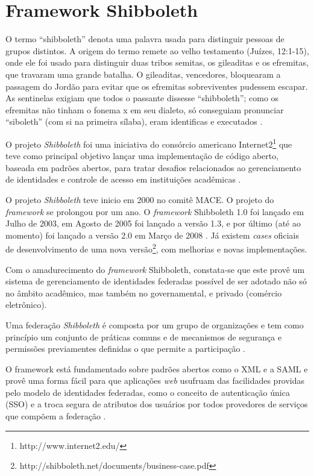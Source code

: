 \section{Framework Shibboleth}
\label{s_c2_framework}

O termo ``shibboleth'' denota uma palavra usada para distinguir pessoas de grupos distintos. A origem do termo remete ao velho testamento (Juízes, 12:1-15), onde ele foi usado para distinguir duas tribos semitas, os gileaditas e os efremitas, que travaram uma grande batalha. O gileaditas, vencedores, bloquearam a passagem do Jordão para evitar que os efremitas sobreviventes pudessem escapar. As sentinelas exigiam que todos o passante dissesse ``shibboleth''; como os efremitas não tinham o fonema \/x\/ em seu dialeto, só conseguiam pronunciar ``siboleth'' (com \/si\/ na primeira sílaba), eram identificas e executados \cite{moreira:11}.

O projeto \textit{Shibboleth} \cite{scavo:05} foi uma iniciativa do consórcio americano Internet2\footnote{http://www.internet2.edu/} que teve como principal objetivo lançar uma implementação de código aberto, baseada em padrões abertos, para tratar desafios relacionados ao gerenciamento de identidades e controle de acesso em instituições acadêmicas \cite{wangham:10a}.

O projeto \textit{Shibboleth} teve inicio em 2000 no comitê \ac{MACE}. O projeto do \textit{framework} se prolongou por um ano.  O \textit{framework} Shibboleth 1.0  foi lançado em Julho de 2003, em Agosto de 2005 foi lançado a versão 1.3, e por último (até ao momento) foi lançado a versão 2.0 em Março de 2008 \cite{manuel:09}. Já existem \textit{cases} oficiais de desenvolvimento de uma nova versão\footnote{http://shibboleth.net/documents/business-case.pdf}, com melhorias e novas implementações.

Com o amadurecimento do \textit{framework} Shibboleth, constata-se que este provê um sistema de gerenciamento de identidades federadas possível de ser adotado não só no âmbito acadêmico, mas também no governamental, e privado (comércio eletrônico).

Uma federação \textit{Shibboleth} é composta por um grupo de organizações e tem como princípio um conjunto de práticas comuns e de mecanismos de segurança e permissões previamentes definidas o que permite a participação \cite{carmody:05}.

O framework está fundamentado sobre padrões abertos como o XML e a SAML e provê uma forma fácil para que aplicações \textit{web} usufruam das facilidades providas pelo modelo de identidades federadas, como o conceito de autenticação única (SSO) e a troca segura de atributos dos usuários por todos provedores de serviços que compõem a federação \cite{wangham:10b}.

